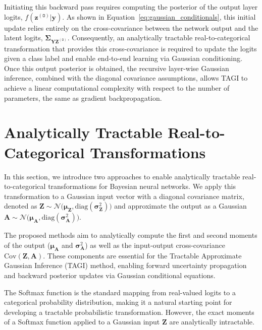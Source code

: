 \documentclass{uai2026} %
\begin{document}
Initiating this backward pass requires computing the posterior of the output layer logits, $f(\bm{z}^{(\mathtt{O})}|\bm{y})$. As shown in Equation~\ref{eq:gaussian_conditionals}, this initial update relies entirely on the cross-covariance between the network output and the latent logits, $\bm{\Sigma}_{\bm{Y}\!\bm{Z}^{(\mathtt{O})}}$. Consequently, an analytically tractable real-to-categorical transformation that provides this cross-covariance is required to update the logits given a class label and enable end-to-end learning via Gaussian conditioning. Once this output posterior is obtained, the recursive layer-wise Gaussian inference, combined with the diagonal covariance assumptions, allows TAGI to achieve a linear computational complexity with respect to the number of parameters, the same as gradient backpropagation.

\section{Analytically Tractable Real-to-Categorical Transformations}

In this section, we introduce two approaches to enable analytically tractable real-to-categorical transformations for Bayesian neural networks. We apply this transformation to a Gaussian input vector with a diagonal covariance matrix, denoted as $\bm{Z} \sim \mathcal{N}\big(\bm{\mu}_{\bm{Z}}, \text{diag}(\bm{\sigma}_{\bm{Z}}^2)\big)$ and approximate the output as a Gaussian $\bm{A} \sim \mathcal{N}\big(\bm{\mu}_{\bm{A}}, \text{diag}(\bm{\sigma}_{\bm{A}}^2)\big)$. 


The proposed methods aim to analytically compute the first and second moments of the output ($\bm{\mu}_{\bm{A}}$ and $\bm{\sigma}_{\bm{A}}^2$) as well as the input-output cross-covariance $\text{Cov}(\bm{Z},\bm{A})$. These components are essential for the Tractable Approximate Gaussian Inference (TAGI) method, enabling forward uncertainty propagation and backward posterior updates via Gaussian conditional equations.

The \textrm{Softmax} function is the standard mapping from real-valued logits to a categorical probability distribution, making it a natural starting point for developing a tractable probabilistic transformation. However, the exact moments of a \textrm{Softmax} function applied to a Gaussian input $\bm{Z}$ are analytically intractable.
\end{document}
